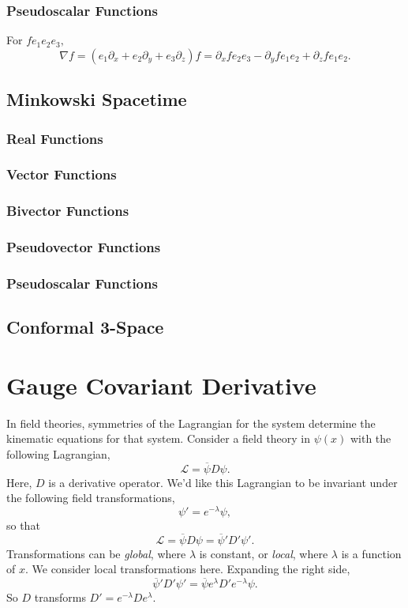 	\subsubsection{Pseudoscalar Functions}
	
	For $fe_1e_2e_3,$	
	\[
	\nabla f = \left(e_1\partial_x + e_2\partial_y + e_3\partial_z\right) f = \partial_x fe_2e_3 - \partial_yfe_1e_2 + \partial_zf e_1e_2. 
	\]	
	\subsection{Minkowski Spacetime}
	\subsubsection{Real Functions}
	\subsubsection{Vector Functions}
	\subsubsection{Bivector Functions}
	\subsubsection{Pseudovector Functions}
	\subsubsection{Pseudoscalar Functions}
	\subsection{Conformal 3-Space}
	
	\section{Gauge Covariant Derivative}
	
	In field theories, symmetries of the Lagrangian for the system determine the kinematic equations for that system. Consider a field theory in $\psi\left(x\right)$ with the following Lagrangian,	
	\[
	\mathcal{L} = \overline{\psi} D \psi.
	\]	
	Here, $D$ is a derivative operator. We'd like this Lagrangian to be invariant under the following field transformations,	
	\[
	\psi' = e^{-\lambda}\psi,
	\]	
	so that	
	\[
	\mathcal{L} = \overline{\psi} D \psi = \overline{\psi}' D' \psi'.
	\]	
	Transformations can be \emph{global}, where $\lambda$ is constant, or \emph{local}, where $\lambda$ is a function of $x$. We consider local transformations here. Expanding the right side,	
	\[
	\overline{\psi}' D' \psi' = \overline{\psi}e^{\lambda} D'e^{-\lambda}\psi.
	\]	
	So $D$ transforms $D' = e^{-\lambda} De^{\lambda}.$
	
